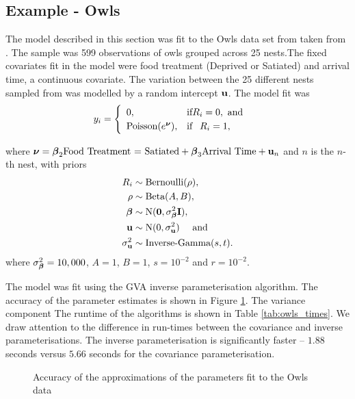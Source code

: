 \subsection{Example - Owls}
\label{sec:owls}

The model described in this section was fit to the Owls data set from taken
from \cite{zuur_mixed_2009}.  The sample was 599 observations of owls grouped
across 25 nests.The fixed covariates fit in the model were food treatment
(Deprived or Satiated) and arrival time, a continuous covariate.  The variation
between the 25 different nests sampled from was modelled by a random intercept
${\bf u}$. The model fit was
$$
	y_i = \begin{cases}
	\begin{array}{ll}
	0, & \text{if} R_i = 0, \text{ and } \\
	\text{Poisson}(e^{\boldsymbol \nu}), & \text{if} \phantom{-} R_i = 1,
	\end{array}
	\end{cases}
$$

\noindent where ${\boldsymbol \nu} = {{\boldsymbol \beta}_2 \text{Food Treatment = Satiated} + {\boldsymbol \beta}_3
\text{Arrival Time} + {\bf u}_n}$ and $n$ is the $n$-th nest, with priors
\begin{align*}
R_i &\sim \text{Bernoulli}(\rho), \\
\rho &\sim \text{Beta}(A, B), \\
{\boldsymbol \beta} &\sim \text{N}({\bf 0}, \sigma_{\boldsymbol \beta}^2 {\bf I}), \\
{\bf u} &\sim \text{N}(0, \sigma_{\bf u}^2) \quad \text{ and } \\
\sigma_{\bf u}^2 &\sim \text{Inverse-Gamma}(s, t).
\end{align*}
\noindent where $\sigma_{\boldsymbol \beta}^2=10,000$, $A=1$, $B=1$, $s=10^{-2}$ and
$r=10^{-2}$.

The model was fit using the GVA inverse parameterisation algorithm. The
accuracy of the parameter estimates is shown in Figure \ref{fig:owls}. The
variance component The runtime of the algorithms is shown in Table
\ref{tab:owls_times}. We draw attention to the difference in run-times between
the covariance and inverse parameterisations. The inverse parameterisation is
significantly faster -- $1.88$ seconds versus $5.66$ seconds for the covariance
parameterisation.

\begin{figure}[h]
	\centering
	\caption{Accuracy of the approximations of the parameters fit to the Owls data}
	\label{fig:owls}
\end{figure}

